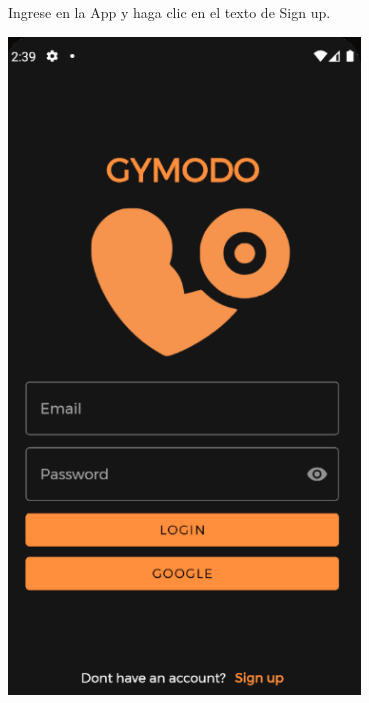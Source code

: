 \documentclass[12pt,a4paper]{article}
\begin{document}
\begin{enumerate}
\begin{minipage}{.60\textwidth}
  \item Ingrese en la App y haga clic en el texto de Sign up.
\end{minipage}
\begin{minipage}{.40\textwidth}
  \includegraphics[width=0.7\textwidth, right]{loginpage}
\end{minipage}



\end{enumerate}
\end{document}
